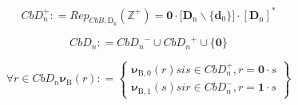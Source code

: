 \begin{enumerate}
\begin{enumerate}
\begin{enumerate}
      \[\mathit{CbD}_{n}^{+}{: =}\mathit{Rep}_{\mathit{CbB},\mathbf{\mathrm{D}}_{\mathbf{\mathrm{n}}}}{(\mathbb{Z}^{\mathbf{\mathrm{+}}})}{=}{{\mathbf{0} \cdot {\lbrack{\mathbf{D}_{\mathbf{\mathrm{n}}} \smallsetminus {\{\mathbf{d}_{\mathbf{\mathrm{0}}}\}}}\rbrack}} \cdot \left\lbrack \mathbf{D}_{\mathbf{\mathrm{n}}} \right\rbrack^{\mathbf{\mathrm{\ast}}}}\]

      \[\mathit{CbD}_{n}{: =}{{{\mathit{CbD}_{n}}^{-} \cup {\mathit{CbD}_{n}}^{+}} \cup {\{\mathbf{0}\}}}\]

      \[\forall{\mathit{r} \in \mathit{CbD}_{n}}\mathbf{\nu}_{\mathbf{\mathrm{Β}}}{(\mathit{r})}{: =}\begin{Bmatrix}
      {\mathbf{\nu}_{\mathbf{\mathrm{Β,0}}}{(\mathit{r})}\mathit{si}{\mathit{s} \in \mathit{CbD}_{n}^{+}},{r = {\mathbf{0} \cdot s}}} \\
      {\mathbf{\nu}_{\mathbf{\mathrm{Β,1}}}{(\mathit{s})}\mathit{si}{\mathit{r} \in \mathit{CbD}_{n}^{-}},{r = {\mathbf{1} \cdot s}}}
      \end{Bmatrix}\]


\end{enumerate}
\end{enumerate}
\end{enumerate}
